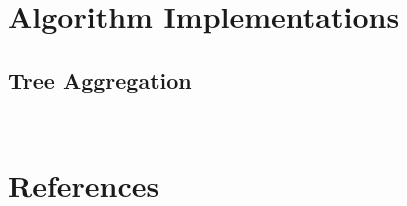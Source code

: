 \documentclass[a4paper,notitlepage]{article}
\begin{document}

\clearpage


\appendixpage
\addappheadtotoc
\appendix



\newpage

\section{Algorithm Implementations}

\subsection{Tree Aggregation}

\inputminted[linenos=true,tabsize=3,fontsize=\small,frame=lines,framesep=2mm]{c}{../Algorithms/Common/net/tree-aggregator.h}
\inputminted[linenos=true,tabsize=3,fontsize=\small,frame=lines,framesep=2mm]{c}{../Algorithms/Common/net/tree-aggregator.c}



\newpage


\section{References}
\renewcommand{\refname}{\vspace{-1cm}}


\end{document}
